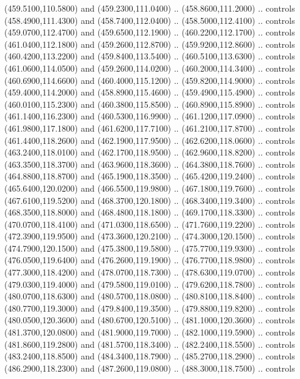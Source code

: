 {\begin{scope}[y=0.80pt, x=0.80pt, yscale=-1, xscale=1, inner sep=0pt, outer sep=0pt, #1]
      (459.5100,110.5800) and (459.2300,111.0400) .. (458.8600,111.2000) .. controls
      (458.4900,111.4300) and (458.7400,112.0400) .. (458.5000,112.4100) .. controls
      (459.0700,112.4700) and (459.6500,112.1900) .. (460.2200,112.1700) .. controls
      (461.0400,112.1800) and (459.2600,112.8700) .. (459.9200,112.8600) .. controls
      (460.4200,113.2200) and (459.8400,113.5400) .. (460.5100,113.6300) .. controls
      (461.0600,114.0500) and (459.2600,114.0200) .. (460.2000,114.3400) .. controls
      (460.6900,114.6600) and (460.4000,115.1200) .. (459.8200,114.9000) .. controls
      (459.4000,114.2000) and (458.8900,115.4600) .. (459.4900,115.4900) .. controls
      (460.0100,115.2300) and (460.3800,115.8500) .. (460.8900,115.8900) .. controls
      (461.1400,116.2300) and (460.5300,116.9900) .. (461.1200,117.0900) .. controls
      (461.9800,117.1800) and (461.6200,117.7100) .. (461.2100,117.8700) .. controls
      (461.4400,118.2600) and (462.1900,117.9500) .. (462.6200,118.0600) .. controls
      (463.2400,118.0100) and (462.1700,118.9500) .. (462.9600,118.8200) .. controls
      (463.3500,118.3700) and (463.9600,118.3600) .. (464.3800,118.7600) .. controls
      (464.8800,118.8700) and (465.1900,118.3500) .. (465.4200,119.2400) .. controls
      (465.6400,120.0200) and (466.5500,119.9800) .. (467.1800,119.7600) .. controls
      (467.6100,119.5200) and (468.3700,120.1800) .. (468.3400,119.3400) .. controls
      (468.3500,118.8000) and (468.4800,118.1800) .. (469.1700,118.3300) .. controls
      (470.0700,118.4100) and (471.0300,118.6500) .. (471.7600,119.2200) .. controls
      (472.3900,119.9500) and (473.3600,120.2100) .. (474.3000,120.1500) .. controls
      (474.7900,120.1500) and (475.3800,119.5800) .. (475.7700,119.9300) .. controls
      (476.0500,119.6400) and (476.2600,119.1900) .. (476.7700,118.9800) .. controls
      (477.3000,118.4200) and (478.0700,118.7300) .. (478.6300,119.0700) .. controls
      (479.0300,119.4000) and (479.5800,119.0100) .. (479.6200,118.7800) .. controls
      (480.0700,118.6300) and (480.5700,118.0800) .. (480.8100,118.8400) .. controls
      (480.7700,119.3000) and (479.8400,119.3500) .. (479.8800,119.8200) .. controls
      (480.0500,120.3600) and (480.6700,120.5100) .. (481.1000,120.3600) .. controls
      (481.3700,120.0800) and (481.9000,119.7000) .. (482.1000,119.5900) .. controls
      (481.8600,119.2800) and (481.5700,118.3400) .. (482.2400,118.5500) .. controls
      (483.2400,118.8500) and (484.3400,118.7900) .. (485.2700,118.2900) .. controls
      (486.2900,118.2300) and (487.2600,119.0800) .. (488.3000,118.7500) .. controls

\end{scope}}
